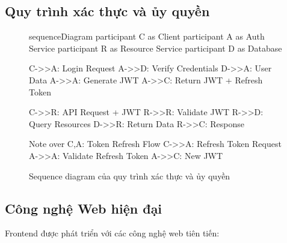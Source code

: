 \subsection{Quy trình xác thực và ủy quyền}
\begin{figure}[h]
\begin{mermaid}
sequenceDiagram
    participant C as Client
    participant A as Auth Service
    participant R as Resource Service
    participant D as Database
    
    C->>A: Login Request
    A->>D: Verify Credentials
    D->>A: User Data
    A->>A: Generate JWT
    A->>C: Return JWT + Refresh Token
    
    C->>R: API Request + JWT
    R->>R: Validate JWT
    R->>D: Query Resources
    D->>R: Return Data
    R->>C: Response
    
    Note over C,A: Token Refresh Flow
    C->>A: Refresh Token Request
    A->>A: Validate Refresh Token
    A->>C: New JWT
\end{mermaid}
\caption{Sequence diagram của quy trình xác thực và ủy quyền}
\end{figure}

\subsection{Công nghệ Web hiện đại}
\hspace{0.5cm}Frontend được phát triển với các công nghệ web tiên tiến:

